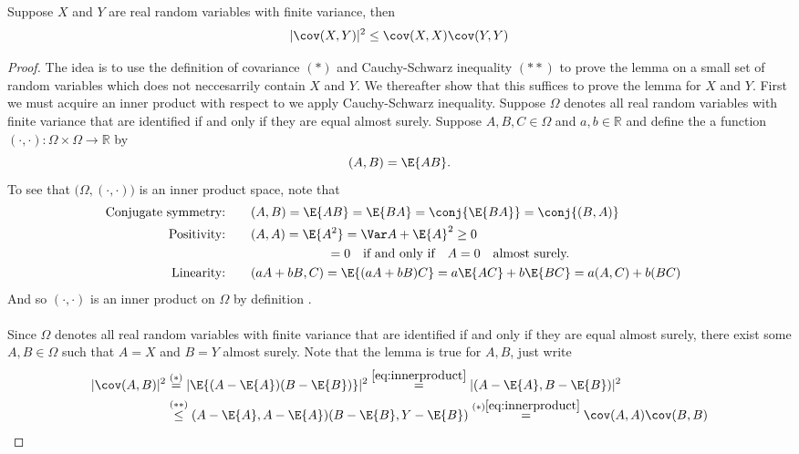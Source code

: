 \documentclass[11pt,english,a4paper]{article}
\begin{document}
\begin{lemma*}
Suppose $X$ and $Y$ are real random variables with finite variance, then
\[
| \cov (X,Y) |^2 \leq \cov (X,X) \cov (Y,Y)
\]
\end{lemma*}
\begin{proof}
The idea is to use the definition of covariance $(*)$ and Cauchy-Schwarz inequality $(**)$ to prove the lemma on a small set of random variables which does not neccesarrily contain $X$ and $Y$. We thereafter show that this suffices to prove the lemma for $X$ and $Y$. First we must acquire an inner product with respect to we apply Cauchy-Schwarz inequality. Suppose $\Omega$ denotes all real random variables with finite variance that are identified if and only if they are equal almost surely. Suppose $A,B,C \in \Omega$ and $a,b \in \mathbb{R}$ and define the a function $( \cdot, \cdot ) : \Omega \times \Omega \to \mathbb{R}$ by
\begin{equation}
(A,B) = \E{A B}. \label{eq:innerproduct}
\end{equation}
To see that $\big( \Omega, (\cdot,\cdot) \big)$ is an inner product space, note that
\begin{align*}
\text{Conjugate symmetry:} \qquad &(A,B) = \E{AB} = \E{BA} = \conj{ \E{BA}} = \conj{(B,A)} \\ 
\text{Positivity:} \qquad &(A,A) = \E{A^2} = \Var A + \E{A}^2 \geq 0 \\ 
&\qquad \qquad \qquad  =0 \quad \text{if and only if} \quad A=0 \quad \text{almost surely.}\\ 
\text{Linearity:} \qquad &(aA + bB,C) = \E{(aA + bB)C} = a\E{AC} + b\E{BC} = a(A,C) + b(BC) &
\end{align*}
And so $( \cdot, \cdot )$ is an inner product on $\Omega$ by definition \parencite{mcdonald_course_2012}. \\
\\
Since $\Omega$ denotes all real random variables with finite variance that are identified if and only if they are equal almost surely, there exist some $A,B \in \Omega$ such that $A=X$ and $B=Y$ almost surely. Note that the lemma is true for $A,B$, just write
\begin{align*}
| \cov (A,B) |^2 &\stackrel{(*)}{=} | \E{(A - \E{A})(B - \E{B})} |^2 \stackrel{\eqref{eq:innerproduct}}{=} | (A-\E{A}, B-\E{B}) |^2 \\
&\stackrel{(**)}{\leq}  (A-\E{A}, A-\E{A})(B-\E{B}, Y-\E{B}) \stackrel{(*)\eqref{eq:innerproduct}}{=} \cov (A,A) \cov (B,B)
\end{align*}

\end{proof}
\end{document}
